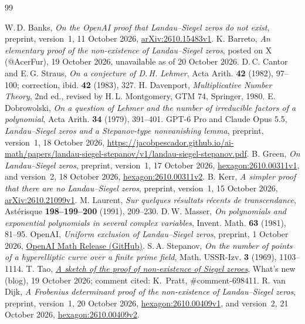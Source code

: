 \documentclass[11pt]{amsart}
\theoremstyle{remark}
\begin{document}
\begin{thebibliography}{99}\footnotesize\raggedright\setlength{\itemsep}{0pt}
 W.\,D. Banks, \emph{On the OpenAI proof that Landau--Siegel zeros do not exist},
preprint, version~1, 11 October 2026, \href{https://arxiv.org/abs/2610.15483v1}{arXiv:2610.15483v1}.
 K. Barreto, \emph{An elementary proof of the non-existence of Landau--Siegel
zeros}, posted on X (@AcerFur), 19 October 2026, unavailable as of 20 October 2026.
 D.\,C. Cantor and E.\,G. Straus, \emph{On a conjecture of D.\,H. Lehmer},
Acta Arith. \textbf{42} (1982), 97--100; correction, ibid. \textbf{42} (1983), 327.
 H. Davenport, \emph{Multiplicative Number Theory}, 2nd ed., revised by
H.\,L. Montgomery, GTM 74, Springer, 1980.
 E. Dobrowolski, \emph{On a question of Lehmer and the number of irreducible
factors of a polynomial}, Acta Arith. \textbf{34} (1979), 391--401.
 GPT-6 Pro and Claude Opus 5.5, \emph{Landau--Siegel zeros and a Stepanov-type
nonvanishing lemma}, preprint, version~1, 18 October 2026,
\url{https://jacobpescador.github.io/ai-math/papers/landau-siegel-stepanov/v1/landau-siegel-stepanov.pdf}.
 B. Green, \emph{On Landau--Siegel zeros}, preprint, version~1, 17 October 2026,
\href{https://hexagonmath.org/abs/2610.00311v1}{hexagon:2610.00311v1}, and version~2, 18 October 2026,
\href{https://hexagonmath.org/abs/2610.00311v2}{hexagon:2610.00311v2}.
 B. Kerr, \emph{A simpler proof that there are no Landau--Siegel zeros}, preprint,
version~1, 15 October 2026, \href{https://arxiv.org/abs/2610.21099v1}{arXiv:2610.21099v1}.
 M. Laurent, \emph{Sur quelques r\'esultats r\'ecents de transcendance},
Ast\'erisque \textbf{198--199--200} (1991), 209--230.
 D.\,W. Masser, \emph{On polynomials and exponential polynomials in several complex
variables}, Invent. Math. \textbf{63} (1981), 81--95.
 OpenAI, \emph{Uniform exclusion of Landau--Siegel zeros}, preprint, 1 October 2026,
\href{https://github.com/openai/math/blob/adc7f1241b42e322a6451854ab7e4b4c146bf78a/preprints/Uniform-exclusion-of-Landau-Siegel-zeros-October-1-2026/paper.pdf}{OpenAI Math Release (GitHub)}.
 S.\,A. Stepanov, \emph{On the number of points of a hyperelliptic curve over a
finite prime field}, Math. USSR-Izv. \textbf{3} (1969), 1103--1114.
 T. Tao, \href{https://terrytao.wordpress.com/2026/10/19/a-sketch-of-the-proof-of-non-existence-of-siegel-zeroes/}{\emph{A sketch of the proof of non-existence of Siegel zeroes}}, What's new (blog), 19 October 2026; comment cited: K.~Pratt, \#comment-698411.
 R. van Dijk, \emph{A Frobenius determinant proof of the non-existence of
Landau--Siegel zeros}, preprint, version~1, 20 October 2026,
\href{https://hexagonmath.org/abs/2610.00409v1}{hexagon:2610.00409v1}, and version~2, 21 October 2026,
\href{https://hexagonmath.org/abs/2610.00409v2}{hexagon:2610.00409v2}.
\end{thebibliography}
\end{document}
